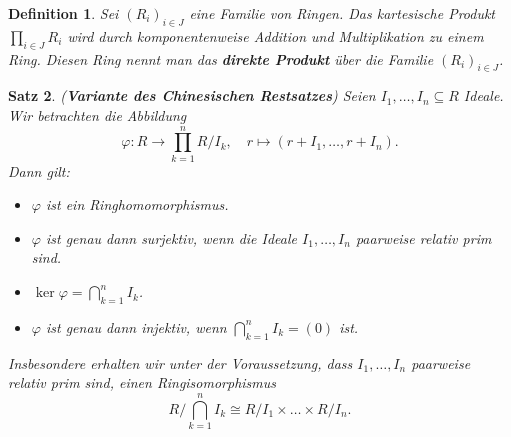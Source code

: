 \documentclass[a4paper, twoside, 11pt, ngerman]{report}
\theoremstyle{definistyle}
\newtheorem{satz}{Satz}[section]
\newtheorem{defini}[satz]{Definition}
\theoremstyle{remark}
\newcommand{\defn}[1]{\textit{\bfseries #1}}
\begin{document}
\begin{defini}\label{def:produkt_ringe}
Sei $(R_i)_{i \in J}$ eine Familie von Ringen. Das kartesische Produkt $\prod_{i \in J} R_i$ wird durch komponentenweise Addition und Multiplikation zu einem Ring. Diesen Ring nennt man das \defn{direkte Produkt} über die Familie $(R_i)_{i \in J}$.
\end{defini}

\begin{satz}\label{satz:chinesischer_restsatz_variante}
(\defn{Variante des Chinesischen Restsatzes}) Seien $I_1, \dots, I_n \subseteq R$ Ideale. Wir betrachten die Abbildung
\[
\varphi \colon R \to \prod_{k=1}^n R / I_k, \quad r \mapsto (r + I_1, \dots, r + I_n).
\]
Dann gilt:
\begin{itemize}
    \item[(a)] $\varphi$ ist ein Ringhomomorphismus.
    \item[(b)] $\varphi$ ist genau dann surjektiv, wenn die Ideale $I_1, \dots, I_n$ paarweise relativ prim sind.
    \item[(c)] $\ker \varphi = \bigcap_{k=1}^n I_k$.
    \item[(d)] $\varphi$ ist genau dann injektiv, wenn $\bigcap_{k=1}^n I_k = (0)$ ist.
\end{itemize}
Insbesondere erhalten wir unter der Voraussetzung, dass $I_1, \dots, I_n$ paarweise relativ prim sind, einen Ringisomorphismus
\[
R / \bigcap_{k=1}^n I_k \cong R / I_1 \times \dots \times R / I_n.
\]
\end{satz}

\end{document}
